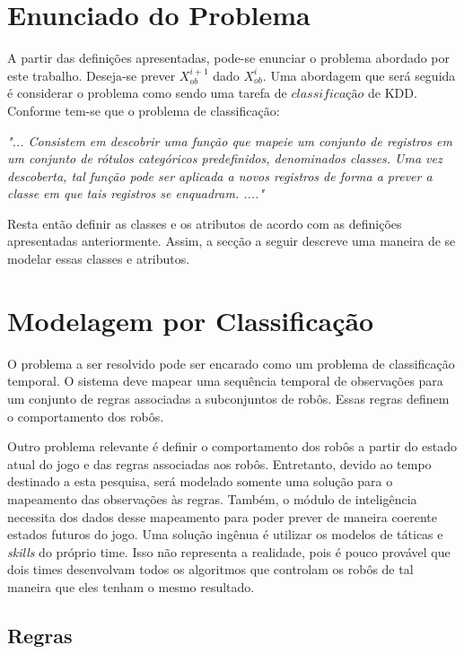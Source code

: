 \section{Enunciado do Problema}

A partir das definições apresentadas, pode-se enunciar o problema 
abordado por este trabalho. Deseja-se prever $X_{ob}^{i+1}$ dado
$X_{ob}^{i}$. Uma abordagem que será seguida é considerar
o problema como sendo uma tarefa de $classificação$ de KDD. Conforme
\cite{passos2005datamining} tem-se que o problema de classificação:

\begin{description}
  \item \textit{"... Consistem em descobrir uma função que mapeie um conjunto de
  registros em um conjunto de rótulos categóricos predefinidos, denominados
  classes. Uma vez descoberta, tal função pode ser aplicada a novos registros
  de forma a prever a classe em que tais registros se enquadram. ...."}
\end{description}

Resta então definir as classes e os atributos de acordo com as definições
apresentadas anteriormente. Assim, a secção a seguir descreve uma maneira
de se modelar essas classes e atributos.

\section{Modelagem por Classificação}

O problema a ser resolvido pode ser
encarado como um problema de classificação temporal. O sistema deve mapear uma
sequência temporal de observações para um conjunto de regras associadas a
subconjuntos de robôs. Essas regras definem o comportamento dos robôs.

Outro problema relevante é definir o comportamento dos robôs a partir do estado
atual do jogo e das regras associadas aos robôs. Entretanto, devido ao tempo
destinado a esta pesquisa, será modelado somente uma solução para o mapeamento das
observações às regras. Também, o módulo de inteligência necessita dos dados
desse mapeamento para poder prever de maneira coerente estados futuros do jogo. Uma
solução ingênua é utilizar os modelos de táticas e \textit{skills} do próprio time.
Isso não representa a realidade, pois é pouco provável que dois times desenvolvam
todos os algoritmos que controlam os robôs de tal maneira que eles tenham o mesmo
resultado.

\subsection{Regras}

